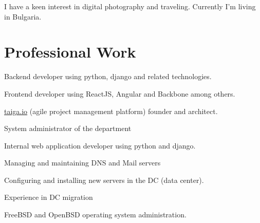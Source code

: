 \documentclass[letterpaper]{cv} %
\begin{document}
\sectionspace

I have a keen interest in digital photography and traveling. Currently I'm
living in Bulgaria.


\sectionspace

\section{Professional Work}
\sectionspace


\vspace{\topsep} %
\begin{tightitemize}
\item Backend developer using python, django and related technologies.
\item Frontend developer using ReactJS, Angular and Backbone among others.
\item \href{https://taiga.io}{taiga.io} (agile project management platform)
  founder and architect.
\end{tightitemize}

\sectionspace



\begin{tightitemize}
\item System administrator of the department
\item Internal web application developer using python and django.
\end{tightitemize}

\sectionspace



\begin{tightitemize}
\item Managing and maintaining DNS and Mail servers
\item Configuring and installing new servers in the DC (data center).
\item Experience in DC migration
\item FreeBSD and OpenBSD operating system administration.
\end{tightitemize}
\end{document}
